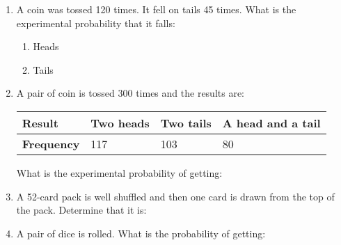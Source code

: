 \begin{enumerate} 
\item A coin was tossed 120 times. It fell on tails 45 times. What is the experimental probability that it falls: 
\begin{enumerate}
\item   Heads
\item   Tails
\end{enumerate}   
\item A pair of coin is tossed 300 times and the results are:

\begin{center}
\noindent\begin{minipage}{0.45\textwidth}
\small
\begin{tabularx}{\textwidth}{|Y|Y|Y|Y|}
\hline
\textbf{Result} & Two heads & Two tails & A head and a tail\\
\hline
\textbf{Frequency} & 117 & 103 & 80\\
\hline
\end{tabularx} 
\end{minipage}
\end{center} 

What is the experimental probability of getting: 
\begin{enumerate}
\end{enumerate} 

\item A 52-card pack is well shuffled and then one card is drawn from the top of the pack. Determine that it is: 
\begin{enumerate}
\end{enumerate} 
\item A pair of dice is rolled. What is the probability of getting: 
\begin{enumerate}
\end{enumerate} 
\end{enumerate}  
